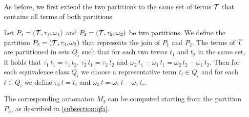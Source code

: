 As before, we first extend the two partitions to the same set of terms $\mathcal{T}$ that contains all terms of both partitions.

Let $P_1 = (\mathcal{T}, \tau_1, \omega_1)$ and $P_2 = (\mathcal{T}, \tau_2, \omega_2)$ be two partitions.
We define the partition $P_3 = (\mathcal{T}, \tau_3, \omega_3)$ that represents the join of $P_1$ and $P_2$.
The terms of $\mathcal{T}$ are partitioned in sets $Q_i$ such that for each two terms $t_1$ and $t_2$ in the same set, it holds that $\tau_1\,t_1 = \tau_1\,t_2$, $\tau_2\,t_1 = \tau_2\,t_2$ and $\omega_2\,t_1 -\omega_1\,t_1 = \omega_2\,t_2 - \omega_1\,t_2$.
Then for each equivalence class $Q_i$ we choose a representative term $t_i\in Q_i$ and
for each $t \in Q_i$ we define $\tau_3\,t = t_i$ and $\omega_3\,t = \omega_1\,t - \omega_1\,t_i$.

The corresponding automaton $M_3$ can be computed starting from the partition $P_3$,
as described in \cref{subsection:qfa}.


